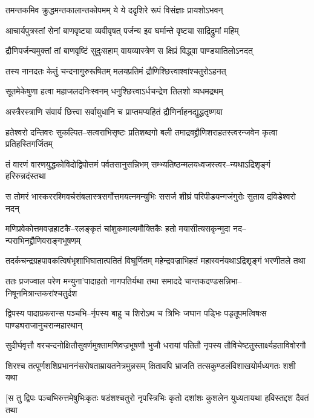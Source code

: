 \twolineshloka
{तमन्तकमिव क्रुद्धमन्तकालान्तकोपमम्}
{ये ये ददृशिरे रूपं विसंज्ञाः प्रायशोऽभवन्}


\twolineshloka
{आचार्यपुत्रस्तां सेनां बाणवृष्ट्या व्यवीवृषत्}
{पर्जन्य इव घर्मान्ते वृष्ट्या साद्रिद्रुमां महिम्}


\twolineshloka
{द्रौणिपर्जन्यमुक्तां तां बाणवृष्टिं सुदुःसहाम्}
{वायव्यास्त्रेण स क्षिप्रं विद्ध्वा पाण्ड्यातिलोऽनदत्}


\twolineshloka
{तस्य नानदतः केतुं चन्दनागुरुरूषितम्}
{मलयप्रतिमं द्रौणिश्छित्त्वाश्वांश्चतुरोऽहनत्}


\twolineshloka
{सूतमेकेषुणा हत्वा महाजलदनिःस्वनम्}
{धनुश्छित्त्वाऽर्धचन्द्रेण तिलशो व्यधमद्रथम्}


\twolineshloka
{अस्त्रैरस्त्राणि संवार्य छित्त्वा सर्वायुधानि च}
{प्राप्तमप्यहितं द्रौणिर्नाहनद्युद्धतृष्णया}


\twolineshloka
{हतेश्वरो दन्तिवरः सुकल्पित--सत्वराभिसृष्टः प्रतिशब्दगो बली}
{तमाद्रवद्द्रौणिशराहतस्त्वरन्जवेन कृत्वा प्रतिहस्तिगर्जितम्}


\twolineshloka
{तं वारणं वारणयुद्धकोविदोद्विपोत्तमं पर्वतसानुसन्निभम्}
{सम्भ्यतिष्ठन्मलयध्वजस्त्वर--न्यथाऽद्रिशृङ्गं हरिरुन्नदंस्तथा}


\twolineshloka
{स तोमरं भास्कररश्मिवर्चसंबलास्त्रसर्गोत्तमयत्नमन्युभिः}
{ससर्ज शीघ्रं परिपीडयन्गजंगुरोः सुताय द्रविडेश्वरो नदन्}


\twolineshloka
{मणिप्रवेकोत्तमवज्रहाटकै--रलङ्कृतं चांशुकमाल्यमौक्तिकैः}
{हतो मयासीत्यसकृन्मुदा नद--न्पराभिनद्द्रौणिवराङ्गभूषणम्}


\twolineshloka
{तदर्कचन्द्रग्रहपावकत्विषंभृशाभिघातात्पतितं विघूर्णितम्}
{महेन्द्रवज्राभिहतं महास्वनंयथाऽद्रिशृङ्गं भरणीतले तथा}


\twolineshloka
{ततः प्रजज्वाल परेण मन्युना'पादाहतो नागपतिर्यथा तथा}
{समाददे चान्तकदण्डसन्निभा--निषूनमित्रान्तकरांश्चतुर्दश}


\twolineshloka
{द्विपस्य पादाग्रकरान्स पञ्चभि--र्नृपस्य बाहू च शिरोऽथ च त्रिभिः}
{जघान पड्भिः पडृतूपमत्विषःस पाण्ड्यराजानुचरान्महारथान्}


\twolineshloka
{सुदीर्घवृत्तौ वरचन्दनोक्षितौसुवर्णमुक्तामणिवज्रभूषणौ}
{भुजौ धरायां पतितौ नृपस्य तौविचेष्टतुस्तार्क्ष्यहताविवोरगौ}


\twolineshloka
{शिरश्च तत्पूर्णशशिप्रभाननंसरोषताम्रायतनेत्रमुन्नसम्}
{क्षितावपि भ्राजति तत्सकुण्डलंविशाखयोर्मध्यगतः शशी यथा}


\twolineshloka
{[स तु द्विपः पञ्चभिरुत्तमेषुभिःकृतः षडंशश्चतुरो नृपस्त्रिभिः}
{कृतो दशांशः कुशलेन युध्यतायथा हविस्तद्दश दैवतं तथा}


